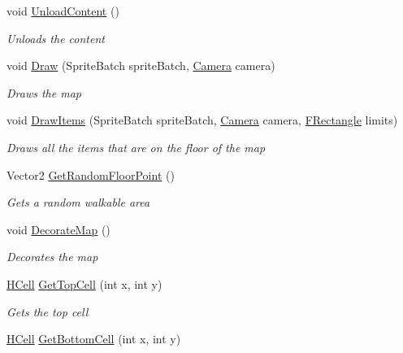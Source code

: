 \begin{DoxyCompactItemize}
void \hyperlink{class_hel_project_1_1_game_world_1_1_map_1_1_h_map_a83dff5b5aecb9907e9ae2e78d6c115f3}{Unload\+Content} ()
\begin{DoxyCompactList}\small\item\em Unloads the content \end{DoxyCompactList}\item 
void \hyperlink{class_hel_project_1_1_game_world_1_1_map_1_1_h_map_af561c3a13ca537b9f32c3d2cc122c2d7}{Draw} (Sprite\+Batch sprite\+Batch, \hyperlink{class_hel_project_1_1_u_i_1_1_camera}{Camera} camera)
\begin{DoxyCompactList}\small\item\em Draws the map \end{DoxyCompactList}\item 
void \hyperlink{class_hel_project_1_1_game_world_1_1_map_1_1_h_map_aa20928d3f1d18d4b1625c5326f65e0cd}{Draw\+Items} (Sprite\+Batch sprite\+Batch, \hyperlink{class_hel_project_1_1_u_i_1_1_camera}{Camera} camera, \hyperlink{class_hel_project_1_1_tools_1_1_f_rectangle}{F\+Rectangle} limits)
\begin{DoxyCompactList}\small\item\em Draws all the items that are on the floor of the map \end{DoxyCompactList}\item 
Vector2 \hyperlink{class_hel_project_1_1_game_world_1_1_map_1_1_h_map_afd943562de7043cdf18b27ede54d2f7b}{Get\+Random\+Floor\+Point} ()
\begin{DoxyCompactList}\small\item\em Gets a random walkable area \end{DoxyCompactList}\item 
void \hyperlink{class_hel_project_1_1_game_world_1_1_map_1_1_h_map_a765937b037dbeafac4fb455e393d8d9b}{Decorate\+Map} ()
\begin{DoxyCompactList}\small\item\em Decorates the map \end{DoxyCompactList}\item 
\hyperlink{class_hel_project_1_1_game_world_1_1_map_1_1_h_cell}{H\+Cell} \hyperlink{class_hel_project_1_1_game_world_1_1_map_1_1_h_map_a07c6bee8336fab355258507d1c189a81}{Get\+Top\+Cell} (int x, int y)
\begin{DoxyCompactList}\small\item\em Gets the top cell \end{DoxyCompactList}\item 
\hyperlink{class_hel_project_1_1_game_world_1_1_map_1_1_h_cell}{H\+Cell} \hyperlink{class_hel_project_1_1_game_world_1_1_map_1_1_h_map_a8e1d71f1100f0c949039cee325413e21}{Get\+Bottom\+Cell} (int x, int y)

\end{DoxyCompactItemize}
